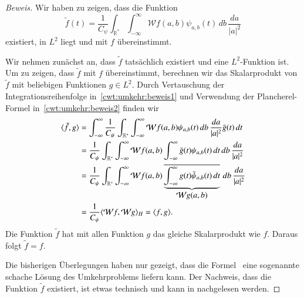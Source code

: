 \begin{proof}[Beweis]
Wir haben zu zeigen, dass die Funktion
\begin{equation}
\tilde{f}(t) = \frac{1}{C_{\psi}}\int_{\mathbb R^*}\int_{-\infty}^\infty
\mathcal{W}f(a,b) \psi_{a,b}(t)
\,db\,\frac{da}{|a|^2}
\end{equation}
existiert, in $L^2$ liegt  und mit $f$ übereinstimmt.

Wir nehmen zunächst an, dass $\tilde{f}$ tatsächlich existiert und eine
$L^2$-Funktion ist.
Um zu zeigen, dass $\tilde{f}$ mit $f$ übereinstimmt, berechnen wir das
Skalarprodukt von $\tilde{f}$ mit beliebigen Funktionen $g\in L^2$.
Durch Vertauschung der Integrationsreihenfolge in~\eqref{cwt:umkehr:beweis1}
und Verwendung der Plancherel-Formel in~\eqref{cwt:umkehr:beweis2}
finden wir
\begin{align}
\langle \tilde{f},g\rangle
&=
\int_{-\infty}^\infty
\frac1{C_{\psi}} \int_{\mathbb R^*}\int_{-\infty}^\infty
\mathcal{W}f(a,b)
\psi_{a,b}(t)
\,db\,\frac{da}{|a|^2}
\bar{g}(t)
\,dt
\notag
\\
&=
\frac1{C_{\psi}} \int_{\mathbb R^*}\int_{-\infty}^\infty
\mathcal{W}f(a,b)
\int_{-\infty}^\infty
\bar{g}(t)
\psi_{a,b}(t)
\,dt
\,db\,\frac{da}{|a|^2}
\label{cwt:umkehr:beweis1}
\\
&=
\frac1{C_{\psi}} \int_{\mathbb R^*}\int_{-\infty}^\infty
\mathcal{W}f(a,b)
\underbrace{
\overline{
\int_{-\infty}^\infty
g(t)
\bar{\psi}_{a,b}(t)
\,dt
}}_{\displaystyle\mathcal{W}g(a,b)}
\,db\,\frac{da}{|a|^2}
\notag
\\
&=
\frac{1}{C_{\psi}}
\langle \mathcal{W}f, \mathcal{W}g \rangle_H
=
\langle f, g\rangle.
\label{cwt:umkehr:beweis2}
\end{align}
Die Funktion $\tilde{f}$ hat mit allen Funktion $g$ das gleiche Skalarprodukt
wie $f$.
Daraus folgt $\tilde{f}=f$.

Die bisherigen Überlegungen haben nur gezeigt, dass die
Formel~\label{cwt:umkehr} eine sogenannte schache Lösung des Umkehrproblems
liefern kann.
Der Nachweis, dass die Funktion $\tilde{f}$ existiert,
ist etwas technisch und kann
in \cite{buch:daubechies} nachgelesen werden.
\end{proof}



